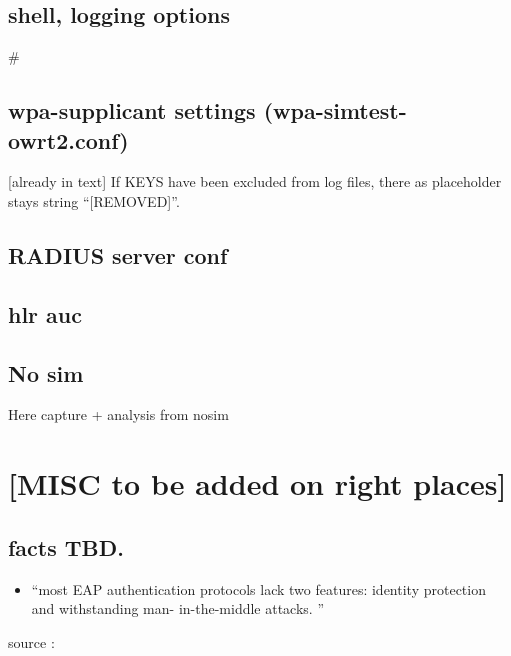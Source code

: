\documentclass[12pt,a4paper,english]{tutthesis}
\begin{document}
\begin{otherlanguage}{english}
\section{shell, logging options}
\label{sec-7-1}
\label{app:fulleap}
\lstset{basicstyle=\ttfamily,columns=fixed}
# %




\section{wpa-supplicant settings (wpa-simtest-owrt2.conf)}
\label{sec-7-2}
[already in text]
If KEYS have been excluded from log files, there as placeholder stays
string ``[REMOVED]''.


\section{RADIUS server conf}
\label{sec-7-3}

\section{hlr auc}
\label{sec-7-4}
\label{app:hlraucgw}

\section{No sim}
\label{sec-7-5}
\label{app:nosim}

Here capture + analysis from nosim


\end{otherlanguage} %
\chapter{[MISC to be added on right places]}
\label{sec-8}
\section{facts TBD.}
\label{sec-8-1}
\begin{itemize}
\item ``most EAP authentication protocols lack two features: identity
protection and withstanding man- in-the-middle attacks. ''
\end{itemize}
source :
\end{document}
